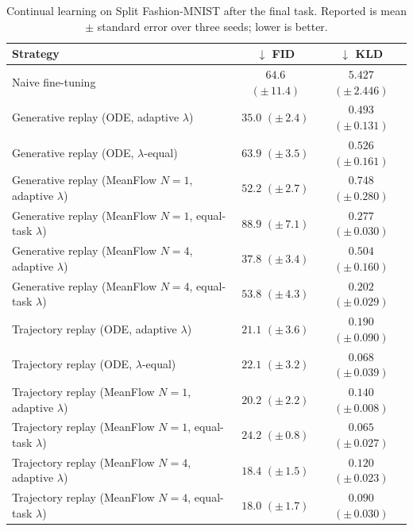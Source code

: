 \begin{table}[t]
\centering
\caption{Continual learning on Split Fashion-MNIST after the final task. Reported is mean {\scriptsize$\pm$} standard error over three seeds; lower is better.}
\label{tab:fmnist_cl_fm}
\begin{tabular}{lcc}
\toprule
Strategy & $\downarrow$ FID & $\downarrow$ KLD \\
\midrule
Naive fine-tuning & $64.6$ {\scriptsize $(\pm\,11.4)$} & $5.427$ {\scriptsize $(\pm\,2.446)$} \\
\midrule
Generative replay (ODE, adaptive $\lambda$) & $35.0$ {\scriptsize $(\pm\,2.4)$} & $0.493$ {\scriptsize $(\pm\,0.131)$} \\
Generative replay (ODE, $\lambda$-equal) & $63.9$ {\scriptsize $(\pm\,3.5)$} & $0.526$ {\scriptsize $(\pm\,0.161)$} \\
\midrule
Generative replay (MeanFlow $N{=}1$, adaptive $\lambda$) & $52.2$ {\scriptsize $(\pm\,2.7)$} & $0.748$ {\scriptsize $(\pm\,0.280)$} \\
Generative replay (MeanFlow $N{=}1$, equal-task $\lambda$) & $88.9$ {\scriptsize $(\pm\,7.1)$} & $0.277$ {\scriptsize $(\pm\,0.030)$} \\
Generative replay (MeanFlow $N{=}4$, adaptive $\lambda$) & $37.8$ {\scriptsize $(\pm\,3.4)$} & $0.504$ {\scriptsize $(\pm\,0.160)$} \\
Generative replay (MeanFlow $N{=}4$, equal-task $\lambda$) & $53.8$ {\scriptsize $(\pm\,4.3)$} & $0.202$ {\scriptsize $(\pm\,0.029)$} \\
\midrule
Trajectory replay (ODE, adaptive $\lambda$) & $21.1$ {\scriptsize $(\pm\,3.6)$} & $0.190$ {\scriptsize $(\pm\,0.090)$} \\
Trajectory replay (ODE, $\lambda$-equal) & $22.1$ {\scriptsize $(\pm\,3.2)$} & $0.068$ {\scriptsize $(\pm\,0.039)$} \\
\midrule
Trajectory replay (MeanFlow $N{=}1$, adaptive $\lambda$) & $20.2$ {\scriptsize $(\pm\,2.2)$} & $0.140$ {\scriptsize $(\pm\,0.008)$} \\
Trajectory replay (MeanFlow $N{=}1$, equal-task $\lambda$) & $24.2$ {\scriptsize $(\pm\,0.8)$} & $0.065$ {\scriptsize $(\pm\,0.027)$} \\
Trajectory replay (MeanFlow $N{=}4$, adaptive $\lambda$) & $18.4$ {\scriptsize $(\pm\,1.5)$} & $0.120$ {\scriptsize $(\pm\,0.023)$} \\
Trajectory replay (MeanFlow $N{=}4$, equal-task $\lambda$) & $18.0$ {\scriptsize $(\pm\,1.7)$} & $0.090$ {\scriptsize $(\pm\,0.030)$} \\
\bottomrule
\end{tabular}
\end{table}
